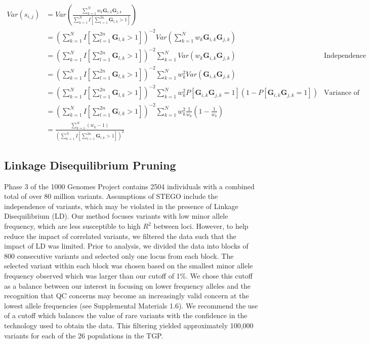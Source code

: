 \begin{align*}
Var\left(s_{i,j}\right) & =Var\left(\frac{\sum_{k=1}^{N}w_{k}\mathbf{G}_{i,k}\mathbf{G}_{j,k}}{\sum_{k=1}^{N}I\left[\sum_{l=1}^{2n}\mathbf{G}_{l,k}>1\right]}\right)\\
 & =\left(\sum_{k=1}^{N}I\left[\sum_{l=1}^{2n}\mathbf{G}_{l,k}>1\right]\right)^{-2}Var\left(\sum_{k=1}^{N}w_{k}\mathbf{G}_{i,k}\mathbf{G}_{j,k}\right)\\
 & =\left(\sum_{k=1}^{N}I\left[\sum_{l=1}^{2n}\mathbf{G}_{l,k}>1\right]\right)^{-2}\sum_{k=1}^{N}Var\left(w_{k}\mathbf{G}_{i,k}\mathbf{G}_{j,k}\right) & \text{Independence of variants}\\
 & =\left(\sum_{k=1}^{N}I\left[\sum_{l=1}^{2n}\mathbf{G}_{l,k}>1\right]\right)^{-2}\sum_{k=1}^{N}w_{k}^{2}Var\left(\mathbf{G}_{i,k}\mathbf{G}_{j,k}\right)\\
 & =\left(\sum_{k=1}^{N}I\left[\sum_{l=1}^{2n}\mathbf{G}_{l,k}>1\right]\right)^{-2}\sum_{k=1}^{N}w_{k}^{2}P\left[\mathbf{G}_{i,k}\mathbf{G}_{j,k}=1\right]\left(1-P\left[\mathbf{G}_{i,k}\mathbf{G}_{j,k}=1\right]\right) & \text{Variance of Bernouli RV}\\
 & =\left(\sum_{k=1}^{N}I\left[\sum_{l=1}^{2n}\mathbf{G}_{l,k}>1\right]\right)^{-2}\sum_{k=1}^{N}w_{k}^{2}\frac{1}{w_{k}}\left(1-\frac{1}{w_{k}}\right)\\
 & =\frac{\sum_{k=1}^{N}\left(w_{k}-1\right)}{\left(\sum_{k=1}^{N}I\left[\sum_{l=1}^{2n}\mathbf{G}_{l,k}>1\right]\right)^{2}}
\end{align*}


\subsection{Linkage Disequilibrium Pruning}

Phase 3 of the 1000 Genomes Project contains 2504 individuals with
a combined total of over 80 million variants. Assumptions of STEGO
include the independence of variants, which may be violated in the
presence of Linkage Disequilibrium (LD). Our method focuses variants
with low minor allele frequency, which are less susceptible to high
$R^{2}$ between loci. However, to help reduce the impact of correlated
variants, we filtered the data such that the impact of LD was limited.
Prior to analysis, we divided the data into blocks of 800 consecutive
variants and selected only one locus from each block. The selected
variant within each block was chosen based on the smallest minor allele
frequency observed which was larger than our cutoff of 1\%. We chose
this cutoff as a balance between our interest in focusing on lower
frequency alleles and the recognition that QC concerns may become
an increasingly valid concern at the lowest allele frequencies (see
Supplemental Materials 1.6). We recommend the use of a cutoff which
balances the value of rare variants with the confidence in the technology
used to obtain the data. This filtering yielded approximately 100,000
variants for each of the 26 populations in the TGP. 

